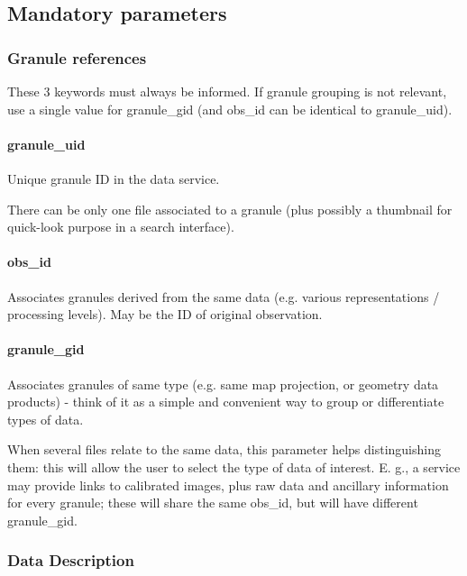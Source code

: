 \documentclass[11pt,a4paper]{ivoa}
\begin{document}
\subsection{Mandatory parameters}

\subsubsection{Granule references}

These 3 keywords must always be informed. If granule grouping is not relevant, use a single value for granule\_gid (and obs\_id can be identical to granule\_uid).

\paragraph{granule\_uid}

Unique granule ID in the data service.

There can be only one file associated to a granule (plus possibly a thumbnail for quick-look purpose in a search interface).

\paragraph{obs\_id}

Associates granules derived from the same data (e.g. various representations / processing levels). May be the ID of original observation.

\paragraph{granule\_gid}

Associates granules of same type (e.g. same map projection, or geometry data products) - think of it as a simple and convenient way to group or differentiate types of data.

When several files relate to the same data, this parameter helps distinguishing them: this will allow the user to select the type of data of interest. E. g., a service may provide links to calibrated images, plus raw data and ancillary information for every granule; these will share the same obs\_id, but will have different granule\_gid.

\subsubsection{Data Description}
\end{document}
